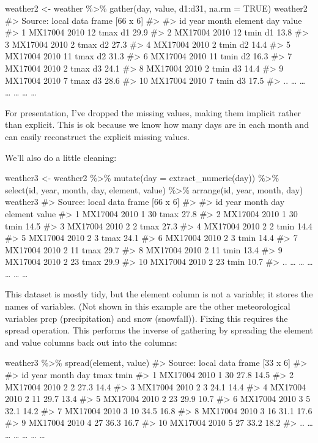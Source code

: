 \documentclass[]{article}
\begin{document}
weather2 \textless{}- weather \%\textgreater{}\% gather(day, value,
d1:d31, na.rm = TRUE) weather2 \#\textgreater{} Source: local data frame
{[}66 x 6{]} \#\textgreater{} \#\textgreater{} id year month element day
value \#\textgreater{} 1 MX17004 2010 12 tmax d1 29.9 \#\textgreater{} 2
MX17004 2010 12 tmin d1 13.8 \#\textgreater{} 3 MX17004 2010 2 tmax d2
27.3 \#\textgreater{} 4 MX17004 2010 2 tmin d2 14.4 \#\textgreater{} 5
MX17004 2010 11 tmax d2 31.3 \#\textgreater{} 6 MX17004 2010 11 tmin d2
16.3 \#\textgreater{} 7 MX17004 2010 2 tmax d3 24.1 \#\textgreater{} 8
MX17004 2010 2 tmin d3 14.4 \#\textgreater{} 9 MX17004 2010 7 tmax d3
28.6 \#\textgreater{} 10 MX17004 2010 7 tmin d3 17.5 \#\textgreater{} ..
\ldots{} \ldots{} \ldots{} \ldots{} \ldots{} \ldots{}

For presentation, I've dropped the missing values, making them implicit
rather than explicit. This is ok because we know how many days are in
each month and can easily reconstruct the explicit missing values.

We'll also do a little cleaning:

weather3 \textless{}- weather2 \%\textgreater{}\% mutate(day =
extract\_numeric(day)) \%\textgreater{}\% select(id, year, month, day,
element, value) \%\textgreater{}\% arrange(id, year, month, day)
weather3 \#\textgreater{} Source: local data frame {[}66 x 6{]}
\#\textgreater{} \#\textgreater{} id year month day element value
\#\textgreater{} 1 MX17004 2010 1 30 tmax 27.8 \#\textgreater{} 2
MX17004 2010 1 30 tmin 14.5 \#\textgreater{} 3 MX17004 2010 2 2 tmax
27.3 \#\textgreater{} 4 MX17004 2010 2 2 tmin 14.4 \#\textgreater{} 5
MX17004 2010 2 3 tmax 24.1 \#\textgreater{} 6 MX17004 2010 2 3 tmin 14.4
\#\textgreater{} 7 MX17004 2010 2 11 tmax 29.7 \#\textgreater{} 8
MX17004 2010 2 11 tmin 13.4 \#\textgreater{} 9 MX17004 2010 2 23 tmax
29.9 \#\textgreater{} 10 MX17004 2010 2 23 tmin 10.7 \#\textgreater{} ..
\ldots{} \ldots{} \ldots{} \ldots{} \ldots{} \ldots{}

This dataset is mostly tidy, but the element column is not a variable;
it stores the names of variables. (Not shown in this example are the
other meteorological variables prcp (precipitation) and snow
(snowfall)). Fixing this requires the spread operation. This performs
the inverse of gathering by spreading the element and value columns back
out into the columns:

weather3 \%\textgreater{}\% spread(element, value) \#\textgreater{}
Source: local data frame {[}33 x 6{]} \#\textgreater{} \#\textgreater{}
id year month day tmax tmin \#\textgreater{} 1 MX17004 2010 1 30 27.8
14.5 \#\textgreater{} 2 MX17004 2010 2 2 27.3 14.4 \#\textgreater{} 3
MX17004 2010 2 3 24.1 14.4 \#\textgreater{} 4 MX17004 2010 2 11 29.7
13.4 \#\textgreater{} 5 MX17004 2010 2 23 29.9 10.7 \#\textgreater{} 6
MX17004 2010 3 5 32.1 14.2 \#\textgreater{} 7 MX17004 2010 3 10 34.5
16.8 \#\textgreater{} 8 MX17004 2010 3 16 31.1 17.6 \#\textgreater{} 9
MX17004 2010 4 27 36.3 16.7 \#\textgreater{} 10 MX17004 2010 5 27 33.2
18.2 \#\textgreater{} .. \ldots{} \ldots{} \ldots{} \ldots{} \ldots{}
\ldots{}
\end{document}
